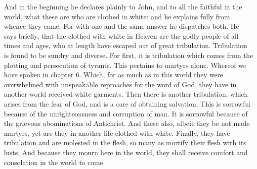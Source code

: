 And in the beginning he declares plainly to John, and to all the faithful in the world, what these are who are clothed in white: and he explains fully from whence they came. For with one and the same answer he dispatches both. He says briefly, that the clothed with white in Heaven are the godly people of all times and ages, who at length have escaped out of great tribulation. Tribulation is found to be sundry and diverse. For first, it is tribulation which comes from the plotting and persecution of tyrants. This pertains to martyrs alone. Whereof we have spoken in chapter 6. Which, for as much as in this world they were overwhelmed with unspeakable reproaches for the word of God, they have in another world received white garments. Then there is another tribulation, which arises from the fear of God, and is a care of obtaining salvation. This is sorrowful because of the unrighteousness and corruption of man. It is sorrowful because of the grievous abominations of Antichrist. And these also, albeit they be not made martyrs, yet are they in another life clothed with white. Finally, they have tribulation and are molested in the flesh, so many as mortify their flesh with its lusts. And because they mourn here in the world, they shall receive comfort and consolation in the world to come.

